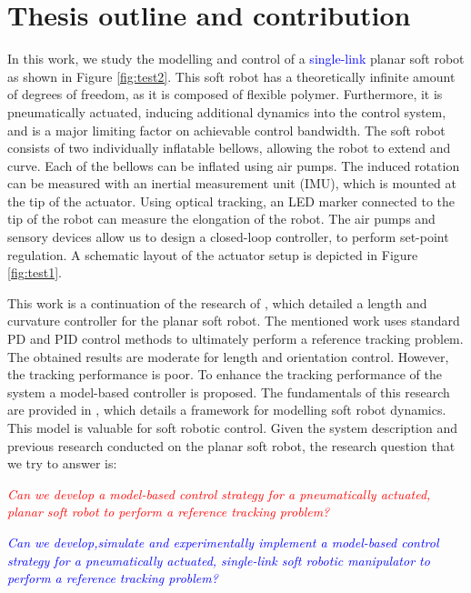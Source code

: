 \section*{Thesis outline and contribution}

In this work, we study the modelling and control of a \textcolor{blue}{single-link} planar soft robot as shown in Figure \ref{fig:test2}. This soft robot has a theoretically infinite amount of degrees of freedom, as it is composed of flexible polymer. Furthermore, it is pneumatically actuated, inducing additional dynamics into the control system, and is a major limiting factor on achievable control bandwidth. The soft robot consists of two individually inflatable bellows, allowing the robot to extend and curve. Each of the bellows can be inflated using air pumps. The induced rotation can be measured with an inertial measurement unit (IMU), which is mounted at the tip of the actuator. Using optical tracking, an LED marker connected to the tip of the robot can measure the elongation of the robot. The air pumps and sensory devices allow us to design a closed-loop controller, to perform set-point regulation. A schematic layout of the actuator setup is depicted in Figure \ref{fig:test1}.

This work is a continuation of the research of \cite{berkers}, which detailed a length and curvature controller for the planar soft robot. The mentioned work uses standard PD and PID control methods to ultimately perform a reference tracking problem. The obtained results are moderate for length and orientation control. However, the tracking performance is poor. To enhance the tracking performance of the system a model-based controller is proposed. The fundamentals of this research are provided in \cite{Caasenbrood2020}, which details a framework for modelling soft robot dynamics. This model is valuable for soft robotic control. Given the system description and previous research conducted on the planar soft robot, the research question that we try to answer is:

\textcolor{red}{\textit{Can we develop a model-based control strategy for a pneumatically actuated, planar soft robot to perform a reference tracking problem?}}


\textcolor{blue}{\textit{Can we develop,simulate and experimentally implement a model-based control strategy for a pneumatically actuated, single-link soft robotic manipulator to perform a reference tracking problem?}}

